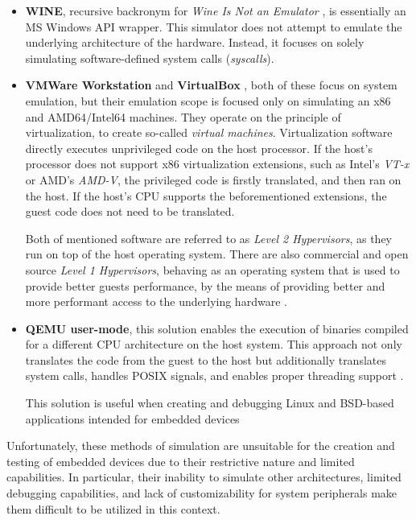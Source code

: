 \begin{itemize}
	\item{\textbf{WINE}, recursive backronym for \textit{Wine Is Not an Emulator} \cite{Wine}, is essentially an MS
	Windows API wrapper. This simulator does not attempt to emulate the underlying architecture of the hardware.
	Instead, it focuses on solely simulating software-defined system calls (\textit{syscalls}).}
	\item{\textbf{VMWare Workstation} \cite{VMWareWorkstation} and \textbf{VirtualBox} \cite{VirtualBox}, both of these
	focus on system emulation, but their emulation scope is focused only on simulating an x86 and AMD64/Intel64 machines.
	They operate on the principle of virtualization, to create so-called \textit{virtual machines}. Virtualization
	software directly executes unprivileged code on the host processor. If the host's processor does not support
	x86 virtualization extensions, such as Intel's \textit{VT-x} or AMD's \textit{AMD-V}, the privileged code is firstly
	translated, and then ran on the host. If the host's CPU supports the beforementioned extensions, the guest code does
	not need to be translated.

	Both of mentioned software are referred to as \textit{Level 2 Hypervisors}, as they run on top of the host
	operating system. There are also commercial and open source \textit{Level 1 Hypervisors}, behaving
	as an operating system that is used to provide better guests performance, by the means of providing better and more
	performant access to the underlying hardware \cite{Graniszewski_Waldemar_Performance_2016}.}
	\item{\textbf{QEMU user-mode}, this solution enables the execution of binaries compiled for a different CPU
	architecture on the host system. This approach not only translates the code from the guest to the host but
	additionally translates system calls, handles POSIX signals, and enables proper threading support
	\cite{QemuUser}.

	This solution is useful when creating and debugging Linux and BSD-based applications intended for embedded devices}
\end{itemize}

Unfortunately, these methods of simulation are unsuitable for the creation and testing of embedded devices due to their
restrictive nature and limited capabilities. In particular, their inability to simulate other architectures, limited
debugging capabilities, and lack of customizability for system peripherals make them difficult to be utilized in this
context.

